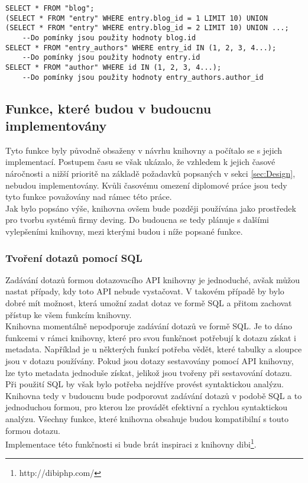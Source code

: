 \documentclass[ing,male,java,dept456]{diploma}						%
\begin{document}
\begin{lstlisting}[style=customsql, label=src:sql-selectin, caption={Dotazy vygenerované z výpisu \ref{src:imp-selectin} knihovnou pypg}]
SELECT * FROM "blog";
(SELECT * FROM "entry" WHERE entry.blog_id = 1 LIMIT 10) UNION  (SELECT * FROM "entry" WHERE entry.blog_id = 2 LIMIT 10) UNION ...; 
	--Do pomínky jsou použity hodnoty blog.id
SELECT * FROM "entry_authors" WHERE entry_id IN (1, 2, 3, 4...); 
	--Do pomínky jsou použity hodnoty entry.id
SELECT * FROM "author" WHERE id IN (1, 2, 3, 4...);
	--Do pomínky jsou použity hodnoty entry_authors.author_id
\end{lstlisting}

\subsection{Funkce, které budou v budoucnu implementovány}

Tyto funkce byly původně obsaženy v návrhu knihovny a počítalo se s jejich implementací. Postupem času se však ukázalo, že vzhledem k jejich časové náročnosti a nižší prioritě na základě požadavků popsaných v sekci \ref{sec:Design}, nebudou implementovány. Kvůli časovému omezení diplomové práce jsou tedy tyto funkce považovány nad rámec této práce. \\
Jak bylo popsáno výše, knihovna ovšem bude později používána jako prostředek pro tvorbu systémů firmy deving. Do budoucna se tedy plánuje s dalšími vylepšeními knihovny, mezi kterými budou i níže popsané funkce.

\subsubsection{Tvoření dotazů pomocí SQL}

Zadávání dotazů formou dotazovacího API knihovny je jednoduché, avšak můžou nastat případy, kdy toto API nebude vystačovat. V takovém případě by bylo dobré mít možnost, která umožní zadat dotaz ve formě SQL a přitom zachovat přístup ke všem funkcím  knihovny. \\
Knihovna momentálně nepodporuje zadávání dotazů ve formě SQL. Je to dáno funkcemi v rámci knihovny, které pro svou funkčnost potřebují k dotazu získat i metadata. Například je u některých funkcí potřeba vědět, které tabulky a sloupce jsou v dotazu používány. Pokud jsou dotazy sestavovány pomocí API knihovny, lze tyto metadata jednoduše získat, jelikož jsou tvořeny při sestavování dotazu. Při použití SQL by však bylo potřeba nejdříve provést syntaktickou analýzu. \\
Knihovna tedy v budoucnu bude podporovat zadávání dotazů v podobě SQL a to jednoduchou formou, pro kterou lze provádět efektivní a rychlou syntaktickou analýzu. Všechny funkce, které knihovna obsahuje budou kompatibilní s touto formou dotazu. \\
Implementace této funkčnosti si bude brát inspiraci z knihovny dibi\footnote{http://dibiphp.com/}.
\end{document}
